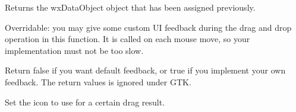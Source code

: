 \label{wxdropsourcegetdataobject}


Returns the wxDataObject object that has been assigned previously.

\label{wxdropsourcegivefeedback}


Overridable: you may give some custom UI feedback during the drag and drop operation
in this function. It is called on each mouse move, so your implementation must not be too
slow.





Return false if you want default feedback, or true if you implement your own
feedback. The return values is ignored under GTK.

\label{wxdropsourcesetcursor}


Set the icon to use for a certain drag result.




